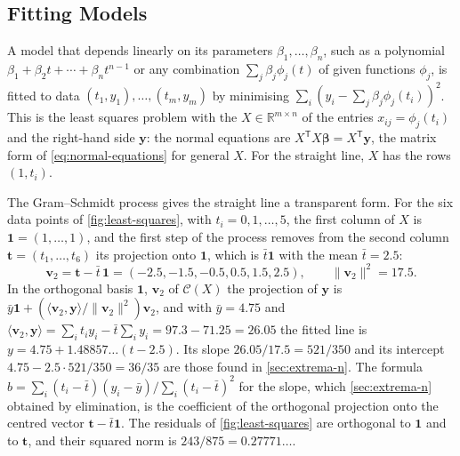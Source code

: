 \subsection{Fitting Models}

A model that depends linearly on its parameters $\beta_1,\ldots,\beta_n$, such as a polynomial $\beta_1+\beta_2t+\cdots+\beta_nt^{n-1}$ or any combination $\sum_j\beta_j\phi_j(t)$ of given functions $\phi_j$, is fitted to data $(t_1,y_1),\ldots,(t_m,y_m)$ by minimising $\sum_i(y_i-\sum_j\beta_j\phi_j(t_i))^2$. This is the least squares problem with the  $X\in\mathbb R^{m\times n}$ of the entries $x_{ij}=\phi_j(t_i)$ and the right-hand side $\mathbf y$: the normal equations are $X^{\mathsf T}X\boldsymbol\beta=X^{\mathsf T}\mathbf y$, the matrix form of \eqref{eq:normal-equations} for general $X$. For the straight line, $X$ has the rows $(1,t_i)$.

The Gram--Schmidt process gives the straight line a transparent form. For the six data points of \cref{fig:least-squares}, with $t_i=0,1,\ldots,5$, the first column of $X$ is $\mathbf 1=(1,\ldots,1)$, and the first step of the process removes from the second column $\mathbf t=(t_1,\ldots,t_6)$ its projection onto $\mathbf 1$, which is $\bar t\mathbf 1$ with the mean $\bar t=2.5$:
\[
\mathbf v_2=\mathbf t-\bar t\,\mathbf 1=(-2.5,-1.5,-0.5,0.5,1.5,2.5),\qquad\|\mathbf v_2\|^2=17.5 .
\]
In the orthogonal basis $\mathbf 1$, $\mathbf v_2$ of $\mathcal C(X)$ the projection of $\mathbf y$ is $\bar y\mathbf 1+(\langle\mathbf v_2,\mathbf y\rangle/\|\mathbf v_2\|^2)\mathbf v_2$, and with $\bar y=4.75$ and $\langle\mathbf v_2,\mathbf y\rangle=\sum_it_iy_i-\bar t\sum_iy_i=97.3-71.25=26.05$ the fitted line is $y=4.75+1.48857\ldots(t-2.5)$. Its slope $26.05/17.5=521/350$ and its intercept $4.75-2.5\cdot521/350=36/35$ are those found in \cref{sec:extrema-n}. The formula $b=\sum_i(t_i-\bar t)(y_i-\bar y)/\sum_i(t_i-\bar t)^2$ for the slope, which \cref{sec:extrema-n} obtained by elimination, is the coefficient of the orthogonal projection onto the centred vector $\mathbf t-\bar t\mathbf 1$. The residuals of \cref{fig:least-squares} are orthogonal to $\mathbf 1$ and to $\mathbf t$, and their squared norm is $243/875=0.27771\ldots$.

